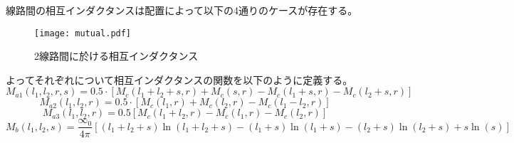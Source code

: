 線路間の相互インダクタンスは配置によって以下の4通りのケースが存在する。
\begin{figure}[H]
    \centering
    \texttt{[image: mutual.pdf]}
    \caption{2線路間に於ける相互インダクタンス}
\end{figure}
よってそれぞれについて相互インダクタンスの関数を以下のように定義する。
\begin{equation}
    M_{a 1}\left(l_{1}, l_{2}, r, s\right)=0.5 \cdot\left[M_{c}\left(l_{1}+l_{2}+s, r\right)+M_{c}(s, r)-M_{c}\left(l_{1}+s, r\right)-M_{c}\left(l_{2}+s, r\right)\right]
\end{equation}
\begin{equation}
    M_{a 2}\left(l_{1}, l_{2}, r\right)=0.5 \cdot\left[M_{c}\left(l_{1}, r\right)+M_{c}\left(l_{2}, r\right)-M_{c}\left(l_{1}-l_{2}, r\right)\right]
\end{equation}
\begin{equation}
    M_{a 3}\left(l_{1}, l_{2}, r\right)=0.5\left[M_{c}\left(l_{1}+l_{2}, r\right)-M_{c}\left(l_{1}, r\right)-M_{c}\left(l_{2}, r\right)\right]
\end{equation}
\begin{equation}
    M_{b}\left(l_{1}, l_{2}, s\right)=\frac{\infty_{0}}{4 \pi}\left[\left(l_{1}+l_{2}+s\right) \ln \left(l_{1}+l_{2}+s\right)-\left(l_{1}+s\right) \ln \left(l_{1}+s\right)-\left(l_{2}+s\right) \ln \left(l_{2}+s\right)+s \ln (s)\right]
\end{equation}

